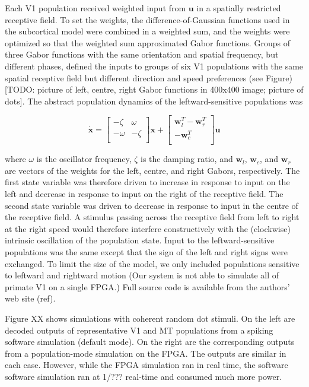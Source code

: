 \documentclass[english]{article}
\begin{document}
Each V1 population received weighted input from $\mathbf{u}$ in a spatially restricted receptive field. To set the weights, the difference-of-Gaussian functions used in the subcortical model were combined in a weighted sum, and the weights were optimized so that the weighted sum approximated Gabor functions. Groups of three Gabor functions with the same orientation and spatial frequency, but different phases, defined the inputs to groups of six V1 populations with the same spatial receptive field but different direction and speed preferences (see Figure) [TODO: picture of left, centre, right Gabor functions in 400x400 image; picture of dots]. The abstract population dynamics of the leftward-sensitive populations was 

\[
\dot{\mathbf{x}} = 
\left[
\begin{array}{cc}
-\zeta & \omega \\ 
-\omega & -\zeta \\ 
\end{array}
\right]
\mathbf{x} + 
\left[
\begin{array}{c}
\mathbf{w}_l^{T} - \mathbf{w}_r^{T} \\ 
-\mathbf{w}_c^{T} \\ 
\end{array}
\right]
\mathbf{u}
\]

where $\omega$ is the oscillator frequency, $\zeta$ is the damping ratio, and $\mathbf{w}_l$, $\mathbf{w}_c$, and $\mathbf{w}_r$ are vectors of the weights for the left, centre, and right Gabors, respectively. The first state variable was therefore driven to increase in response to input on the left and decrease in response to input on the right of the receptive field. The second state variable was driven to decrease in response to input in the centre of the receptive field. A stimulus passing across the receptive field from left to right at the right speed would therefore interfere constructively with the (clockwise) intrinsic oscillation of the population state. Input to the leftward-sensitive populations was the same except that the sign of the left and right signs were exchanged. To limit the size of the model, we only included populations sensitive to leftward and rightward motion (Our system is not able to simulate all of primate V1 on a single FPGA.) Full source code is available from the authors' web site (ref). 

Figure XX shows simulations with coherent random dot stimuli. On the left are decoded outputs of representative V1 and MT populations from a spiking software simulation (default mode). On the right are the corresponding outputs from a population-mode simulation on the FPGA. The outputs are similar in each case. However, while the FPGA simulation ran in real time, the software software simulation ran at 1/??? real-time and consumed much more power. 
\end{document}
